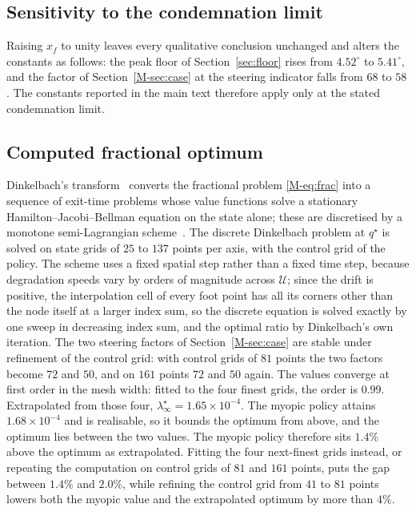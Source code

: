\documentclass[12pt]{article}
\begin{document}
\subsection{Sensitivity to the condemnation limit}

Raising $x_f$ to unity leaves every qualitative conclusion unchanged and
alters the constants as follows: the peak floor of Section~\ref{sec:floor} rises from
$4.52^{\circ}$ to $5.41^{\circ}$, and the factor of
Section~\ref{M-sec:case} at the steering indicator falls from $68$ to $58$.
The constants reported in the main text therefore apply only at the stated
condemnation limit.

\subsection{Computed fractional optimum}
\label{sec:frac}

Dinkelbach's transform~\cite{dinkelbach1967} converts the fractional problem
\eqref{M-eq:frac} into a sequence of exit-time problems whose value functions
solve a stationary Hamilton--Jacobi--Bellman equation on the state alone;
these are discretised by a monotone semi-Lagrangian
scheme~\cite{falcone2014}. The discrete Dinkelbach problem at $q^{\star}$ is solved on state grids of
$25$ to $137$ points per axis, with the control grid of the policy. The
scheme uses a fixed spatial step rather than a fixed time step, because
degradation speeds vary by orders of magnitude across $\mathcal U$; since the
drift is positive, the interpolation cell of every foot point has all its
corners other than the node itself at a larger index sum, so the discrete
equation is solved exactly by one sweep in decreasing index sum, and the
optimal ratio by Dinkelbach's own iteration. The two steering factors of
Section~\ref{M-sec:case} are stable under refinement of the control grid:
with control grids of $81$ points the two factors become $72$ and $50$, and
on $161$ points $72$ and $50$ again. The values
converge at first order in the mesh width: fitted to the four finest grids,
the order is $0.99$. Extrapolated from those four,
$\lambda^{\star}_\infty=1.65\times10^{-4}$. The myopic policy attains
$1.68\times10^{-4}$ and is realisable, so it bounds the optimum from above,
and the optimum lies between the two values. The myopic policy therefore sits
$1.4\%$ above the optimum as extrapolated. Fitting the four next-finest grids instead, or
repeating the computation on control grids of $81$ and $161$ points, puts the
gap between $1.4\%$ and $2.0\%$, while refining the control grid from $41$ to
$81$ points lowers both the myopic value and the extrapolated optimum by more
than $4\%$.
\end{document}
